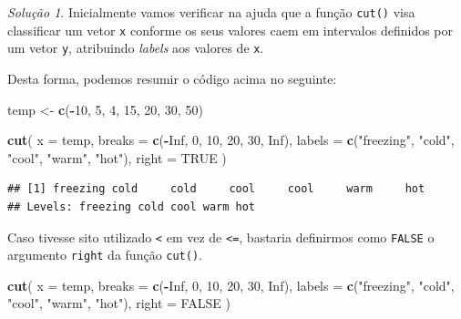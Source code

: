 \documentclass[
]{latex/krantz}
\newenvironment{Shaded}{\begin{snugshade}}{\end{snugshade}}
\newcommand{\AttributeTok}[1]{\textcolor[rgb]{0.13,0.29,0.53}{#1}}
\newcommand{\ConstantTok}[1]{\textcolor[rgb]{0.56,0.35,0.01}{#1}}
\newcommand{\DecValTok}[1]{\textcolor[rgb]{0.00,0.00,0.81}{#1}}
\newcommand{\FunctionTok}[1]{\textcolor[rgb]{0.13,0.29,0.53}{\textbf{#1}}}
\newcommand{\NormalTok}[1]{#1}
\newcommand{\OtherTok}[1]{\textcolor[rgb]{0.56,0.35,0.01}{#1}}
\newcommand{\SpecialCharTok}[1]{\textcolor[rgb]{0.81,0.36,0.00}{\textbf{#1}}}
\newcommand{\StringTok}[1]{\textcolor[rgb]{0.31,0.60,0.02}{#1}}
\theoremstyle{definition}
\theoremstyle{definition}
\theoremstyle{definition}
\theoremstyle{definition}
\theoremstyle{remark}
\newtheorem*{solution}{Solução}
\begin{document}
\begin{solution}
Inicialmente vamos verificar na ajuda que a função \texttt{cut()} visa classificar um vetor \texttt{x} conforme os seus valores caem em intervalos definidos por um vetor \texttt{y}, atribuindo \emph{labels} aos valores de \texttt{x}.

Desta forma, podemos resumir o código acima no seguinte:

\begin{Shaded}
\begin{Highlighting}[]
\NormalTok{temp }\OtherTok{\textless{}{-}} \FunctionTok{c}\NormalTok{(}\SpecialCharTok{{-}}\DecValTok{10}\NormalTok{, }\DecValTok{5}\NormalTok{, }\DecValTok{4}\NormalTok{, }\DecValTok{15}\NormalTok{, }\DecValTok{20}\NormalTok{, }\DecValTok{30}\NormalTok{, }\DecValTok{50}\NormalTok{)}

\FunctionTok{cut}\NormalTok{(}
  \AttributeTok{x =}\NormalTok{ temp,}
  \AttributeTok{breaks =} \FunctionTok{c}\NormalTok{(}\SpecialCharTok{{-}}\ConstantTok{Inf}\NormalTok{, }\DecValTok{0}\NormalTok{, }\DecValTok{10}\NormalTok{, }\DecValTok{20}\NormalTok{, }\DecValTok{30}\NormalTok{, }\ConstantTok{Inf}\NormalTok{),}
  \AttributeTok{labels =} \FunctionTok{c}\NormalTok{(}\StringTok{"freezing"}\NormalTok{, }\StringTok{"cold"}\NormalTok{, }\StringTok{"cool"}\NormalTok{, }\StringTok{"warm"}\NormalTok{, }\StringTok{"hot"}\NormalTok{),}
  \AttributeTok{right =} \ConstantTok{TRUE}
\NormalTok{)}
\end{Highlighting}
\end{Shaded}

\begin{verbatim}
## [1] freezing cold     cold     cool     cool     warm     hot     
## Levels: freezing cold cool warm hot
\end{verbatim}

Caso tivesse sito utilizado \texttt{\textless{}} em vez de \texttt{\textless{}=}, bastaria definirmos como \texttt{FALSE} o argumento \texttt{right} da função \texttt{cut()}.

\begin{Shaded}
\begin{Highlighting}[]
\FunctionTok{cut}\NormalTok{(}
  \AttributeTok{x =}\NormalTok{ temp,}
  \AttributeTok{breaks =} \FunctionTok{c}\NormalTok{(}\SpecialCharTok{{-}}\ConstantTok{Inf}\NormalTok{, }\DecValTok{0}\NormalTok{, }\DecValTok{10}\NormalTok{, }\DecValTok{20}\NormalTok{, }\DecValTok{30}\NormalTok{, }\ConstantTok{Inf}\NormalTok{),}
  \AttributeTok{labels =} \FunctionTok{c}\NormalTok{(}\StringTok{"freezing"}\NormalTok{, }\StringTok{"cold"}\NormalTok{, }\StringTok{"cool"}\NormalTok{, }\StringTok{"warm"}\NormalTok{, }\StringTok{"hot"}\NormalTok{),}
  \AttributeTok{right =} \ConstantTok{FALSE}
\NormalTok{)}
\end{Highlighting}
\end{Shaded}


\end{solution}
\end{document}
